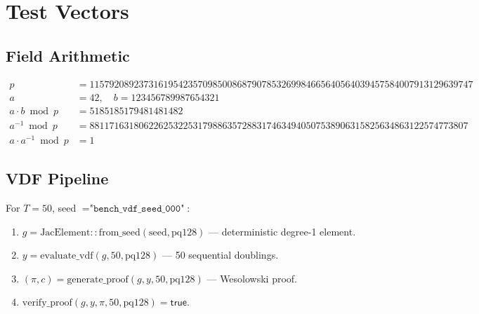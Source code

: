 \documentclass[11pt,a4paper]{article}
\begin{document}
\section{Test Vectors}
\label{app:test}

\subsection{Field Arithmetic}

\begin{align*}
    p &= 115792089237316195423570985008687907853269984665640564039457584007913129639747 \\
    a &= 42, \quad b = 123456789987654321 \\
    a \cdot b \bmod p &= 5185185179481481482 \\
    a^{-1} \bmod p &= 88117163180622625322531798863572883174634940507538906315825634863122574773807 \\
    a \cdot a^{-1} \bmod p &= 1
\end{align*}

\subsection{VDF Pipeline}

For $T = 50$, seed $= \texttt{"bench\_vdf\_seed\_000"}$:
\begin{enumerate}
    \item $g = \mathrm{JacElement::from\_seed}(\mathrm{seed}, \mathrm{pq128})$ --- deterministic degree-1 element.
    \item $y = \mathrm{evaluate\_vdf}(g, 50, \mathrm{pq128})$ --- 50 sequential doublings.
    \item $(\pi, c) = \mathrm{generate\_proof}(g, y, 50, \mathrm{pq128})$ --- Wesolowski proof.
    \item $\mathrm{verify\_proof}(g, y, \pi, 50, \mathrm{pq128}) = \mathsf{true}$.
\end{enumerate}

\end{document}
